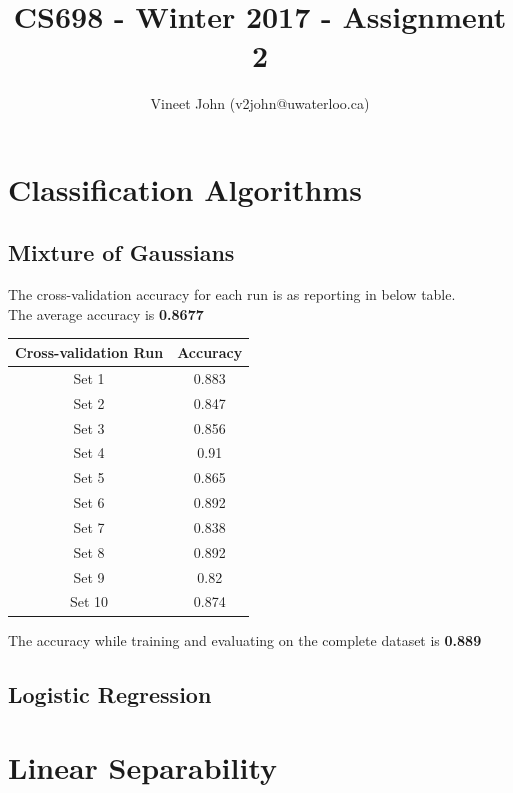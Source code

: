 \documentclass[a4paper]{article}
\title{CS698 - Winter 2017 - Assignment 2}
\author{Vineet John (v2john@uwaterloo.ca)}
\date{}
\begin{document}
\maketitle

\renewcommand\thesubsection{\alph{subsection}}

\section{Classification Algorithms}

\subsection{Mixture of Gaussians}
The cross-validation accuracy for each run is as reporting in below table.\\
The average accuracy is \textbf{0.8677}

\begin{center} 
	\begin{tabular}{ |c|c| } 
		\hline
		\textbf{Cross-validation Run} & \textbf{Accuracy} \\
		\hline
		\hline
		Set 1  & 0.883 \\
		\hline
		Set 2  & 0.847 \\
		\hline
		Set 3  & 0.856 \\
		\hline
		Set 4  & 0.91 \\
		\hline
		Set 5  & 0.865 \\
		\hline
		Set 6  & 0.892 \\
		\hline
		Set 7  & 0.838 \\
		\hline
		Set 8  & 0.892 \\
		\hline
		Set 9  & 0.82 \\
		\hline
		Set 10 & 0.874 \\
		\hline
	\end{tabular}
\end{center}
The accuracy while training and evaluating on the complete dataset is \textbf{0.889}

\newpage

\subsection{Logistic Regression}

\newpage

\section{Linear Separability}
\end{document}
